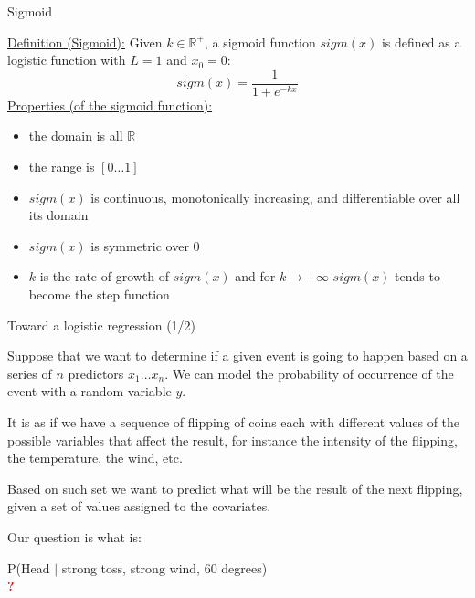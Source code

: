 \documentclass{beamer}
\begin{document}
\begin{frame}
{\centerline{Sigmoid}}
\underline{Definition (Sigmoid):} Given $k \in \mathbb{R}^+$, a
sigmoid function $sigm(x)$ is defined as a logistic function with $L = 1$ and $x_0 = 0$: 
$$ sigm(x) = \dfrac{1}{1+e^{-kx}}$$
\underline{Properties (of the sigmoid function):}
\begin{itemize}
\item the domain is all $\mathbb{R}$
\item the range is $[0 \ldots 1]$ 
\item $sigm(x)$ is continuous, monotonically increasing, and differentiable  over all its domain
\item $sigm(x)$ is symmetric over $0$
\item $k$ is the rate of growth of $sigm(x)$ and for $k \to +\infty$ $sigm(x)$ tends to become the step function
\end{itemize}

\end{frame}

\begin{frame}
{\centerline{Toward a logistic regression (1/2)}}

Suppose that we want to determine if a given event is going to happen based on a series of $n$ predictors $x_1 \ldots x_n$. We can model the probability of occurrence of the event with a random variable $y$.
\newline

It is as if we have a sequence of flipping of coins each with different values of the possible variables that affect the result, for instance the intensity of the flipping, the temperature, the wind, etc.
\newline

Based on such set we want to  predict what will be the result of the next flipping, given a set of values assigned to the covariates.
\newline

Our question is what is:
\begin{center}
P(Head $|$ strong toss, strong wind, 60 degrees)\\

{\Huge \textcolor{red}{\bf ?}}
\end{center}



\end{frame}
\end{document}
